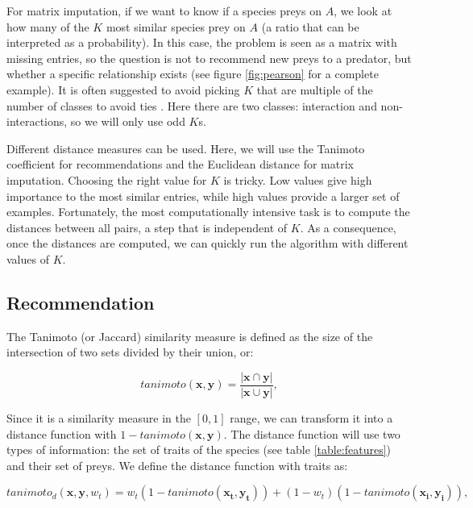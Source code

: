 \documentclass[letterpaper]{article}
\begin{document}
For matrix imputation, if we want to know if a species preys on $A$,
we look at how many of the $K$ most similar species prey on $A$ (a
ratio that can be interpreted as a probability). In this case, the problem is
seen as a matrix with missing entries, so the question is not to recommend new
preys to a predator, but whether a specific relationship exists (see figure
\ref{fig:pearson} for a complete example). It is often suggested to avoid
picking $K$ that are multiple of the number of classes to avoid ties
\cite{the15}. Here there are two classes: interaction and non-interactions, so
we will only use odd $K$s.

Different distance measures can be used. Here, we will use the Tanimoto
coefficient for recommendations and the Euclidean distance for matrix
imputation. Choosing the right value for $K$ is tricky. Low values give high
importance to the most similar entries, while high values provide a larger set
of examples. Fortunately, the most computationally intensive task is to compute
the distances between all pairs, a step that is independent of $K$. As a
consequence, once the distances are computed, we can quickly run the algorithm
with different values of $K$.



\subsection{Recommendation}

The Tanimoto (or Jaccard) similarity measure is defined as the size of the
intersection of two sets divided by their union, or:

\begin{equation}
  tanimoto(\mathbf{x}, \mathbf{y}) = \frac{\left\vert\mathbf{x} \cap \mathbf{y}\right\vert}{\left\vert\mathbf{x} \cup \mathbf{y}\right\vert},
\end{equation}

Since it is a similarity measure in the $[0, 1]$ range, we can transform it
into a distance function with $1 - tanimoto(\mathbf{x}, \mathbf{y})$. The
distance function will use two types of information: the set of traits of the
species (see table \ref{table:features}) and their set of preys. We define the
distance function with traits as:

\begin{equation}
  tanimoto_d(\mathbf{x}, \mathbf{y}, w_t) = w_t(1 - tanimoto(\mathbf{x_t}, \mathbf{y_t})) + (1 - w_t)(1 - tanimoto(\mathbf{x_i}, \mathbf{y_i})),
\end{equation}
\end{document}
